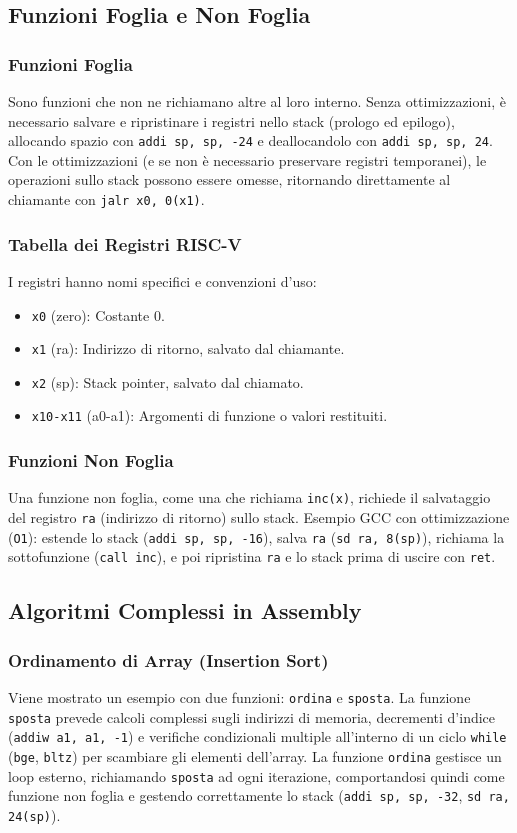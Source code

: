 \documentclass[12pt, a4paper]{article}
\begin{document}
\subsection{Funzioni Foglia e Non Foglia}
\subsubsection{Funzioni Foglia}
Sono funzioni che non ne richiamano altre al loro interno. Senza ottimizzazioni, è necessario salvare e ripristinare i registri nello stack (prologo ed epilogo), allocando spazio con \texttt{addi sp, sp, -24} e deallocandolo con \texttt{addi sp, sp, 24}. Con le ottimizzazioni (e se non è necessario preservare registri temporanei), le operazioni sullo stack possono essere omesse, ritornando direttamente al chiamante con \texttt{jalr x0, 0(x1)}.
\subsubsection{Tabella dei Registri RISC-V}
I registri hanno nomi specifici e convenzioni d'uso:
\begin{itemize}
\item \texttt{x0} (zero): Costante 0.
\item \texttt{x1} (ra): Indirizzo di ritorno, salvato dal chiamante.
\item \texttt{x2} (sp): Stack pointer, salvato dal chiamato.
\item \texttt{x10-x11} (a0-a1): Argomenti di funzione o valori restituiti.
\end{itemize}
\subsubsection{Funzioni Non Foglia}
Una funzione non foglia, come una che richiama \texttt{inc(x)}, richiede il salvataggio del registro \texttt{ra} (indirizzo di ritorno) sullo stack. Esempio GCC con ottimizzazione (\texttt{O1}): estende lo stack (\texttt{addi sp, sp, -16}), salva \texttt{ra} (\texttt{sd ra, 8(sp)}), richiama la sottofunzione (\texttt{call inc}), e poi ripristina \texttt{ra} e lo stack prima di uscire con \texttt{ret}.
\subsection{Algoritmi Complessi in Assembly}
\subsubsection{Ordinamento di Array (Insertion Sort)}
Viene mostrato un esempio con due funzioni: \texttt{ordina} e \texttt{sposta}. La funzione \texttt{sposta} prevede calcoli complessi sugli indirizzi di memoria, decrementi d'indice (\texttt{addiw a1, a1, -1}) e verifiche condizionali multiple all'interno di un ciclo \texttt{while} (\texttt{bge}, \texttt{bltz}) per scambiare gli elementi dell'array. La funzione \texttt{ordina} gestisce un loop esterno, richiamando \texttt{sposta} ad ogni iterazione, comportandosi quindi come funzione non foglia e gestendo correttamente lo stack (\texttt{addi sp, sp, -32}, \texttt{sd ra, 24(sp)}).
\end{document}
